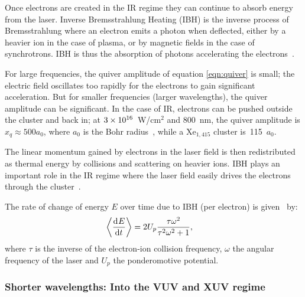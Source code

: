 
Once electrons are created in the IR regime they can continue to absorb energy
from the laser.
Inverse Bremsstrahlung Heating (IBH) is the inverse process of Bremsstrahlung
where an electron emits a photon when deflected, either by a heavier ion in the
case of plasma, or by magnetic fields in the case of synchrotrons. IBH is thus
the absorption of photons accelerating the electrons~\cite{Schlessinger1979}.

For large frequencies, the quiver amplitude of equation \eqref{eqn:quiver} is
small; the electric field oscillates
too rapidly for the electrons to gain significant acceleration.
But for smaller frequencies (larger wavelengths), the quiver amplitude can
be significant. In the case of IR, electrons can be pushed outside the cluster
and back in; at $\ten{3}{16}$~W/cm$^2$ and 800~nm, the quiver
amplitude is $x_q \approx 500 a_0$, where $a_0$ is the Bohr
radius~\cite{Georgescu2007}, while a Xe$_{1,415}$ cluster is~115~$a_0$.

The linear momentum gained by electrons in the laser field is then redistributed
as thermal energy by collisions and scattering on heavier ions.
IBH plays an important role in the IR regime where the laser field easily
drives the electrons through the cluster~\cite{Fennel2010}.

The rate of change of energy $E$ over time due to IBH (per electron) is
given~\cite{Fennel2010} by:
\begin{align}
\left< \frac{\textrm{d}^{{}} {E}}{\textrm{d} t^{{}}} \right> & = 2 U_p \frac{\tau \omega^2}{\tau^2 \omega^2 + 1},
\end{align}
where $\tau$ is the inverse of the electron-ion collision frequency, $\omega$ the
angular frequency of the laser and $U_p$ the ponderomotive potential.


\subsubsection{Shorter wavelengths: Into the VUV and XUV regime}
\label{section:intro:mechanisms:vuv}


